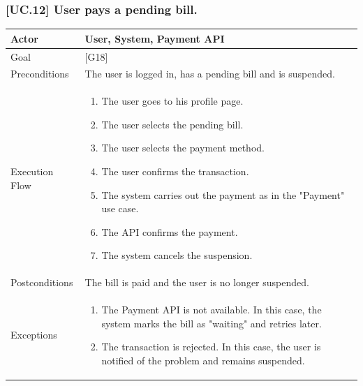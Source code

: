 \documentclass[english]{article}
\begin{document}
			\subsubsection{[UC.12] User pays a pending bill.}
			\begin{tabularx}{\textwidth}{  l  X  }
				\hline
				Actor & User, System, Payment API\\
				\hline
				Goal & [G18]\\
				\hline
				Preconditions & The user is logged in, has a pending bill and is suspended.\\
				\hline
				Execution Flow & \begin{enumerate}
					\item{The user goes to his profile page.}
					\item{The user selects the pending bill.}
					\item{The user selects the payment method.}
					\item{The user confirms the transaction.}
					\item{The system carries out the payment as in the "Payment" use case.}
					\item{The API confirms the payment.}
					\item{The system cancels the suspension.}
				\end{enumerate}\\
				\hline
				Postconditions & The bill is paid and the user is no longer suspended.\\
				\hline
				Exceptions & \begin{enumerate}
					\item{The Payment API is not available. In this case, the system marks the bill as "waiting" and retries later.}
					\item{The transaction is rejected. In this case, the user is notified of the problem and remains suspended.}
				\end{enumerate}\\
				\hline
			\end{tabularx}
\end{document}
